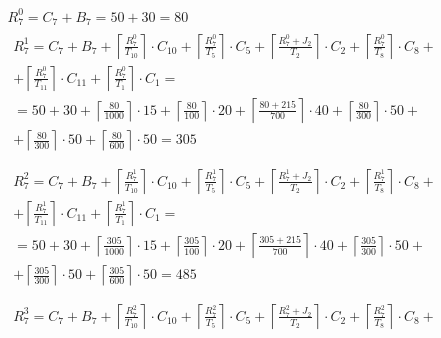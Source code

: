 \begin{gather*}
  R_7^0 = C_7 + B_7 = 50 + 30 = 80 \\
  \begin{multlined}
    R_7^1 = C_7 + B_7 + \left\lceil\frac{R_7^0}{T_{10}}\right\rceil\cdot C_{10} + %
    \left\lceil\frac{R_7^0}{T_5}\right\rceil\cdot C_5 + %
    \left\lceil\frac{R_7^0 + J_2}{T_2}\right\rceil\cdot C_2 + %
    \left\lceil\frac{R_7^0}{T_8}\right\rceil\cdot C_8 + \\%
    + \left\lceil\frac{R_7^0}{T_{11}}\right\rceil\cdot C_{11} + %
    \left\lceil\frac{R_7^0}{T_1}\right\rceil\cdot C_1 = \\%
    = 50 + 30 + \left\lceil\frac{80}{1000}\right\rceil\cdot 15 + %
    \left\lceil\frac{80}{100}\right\rceil\cdot 20 + %
    \left\lceil\frac{80 + 215}{700}\right\rceil\cdot 40 + %
    \left\lceil\frac{80}{300}\right\rceil\cdot 50 + \\%
    + \left\lceil\frac{80}{300}\right\rceil\cdot 50 + %
    \left\lceil\frac{80}{600}\right\rceil\cdot 50 = 305 \\
  \end{multlined} \\
  \begin{multlined}
    R_7^2 = C_7 + B_7 + \left\lceil\frac{R_7^1}{T_{10}}\right\rceil\cdot C_{10} + %
    \left\lceil\frac{R_7^1}{T_5}\right\rceil\cdot C_5 + %
    \left\lceil\frac{R_7^1 + J_2}{T_2}\right\rceil\cdot C_2 + %
    \left\lceil\frac{R_7^1}{T_8}\right\rceil\cdot C_8 + \\%
    + \left\lceil\frac{R_7^1}{T_{11}}\right\rceil\cdot C_{11} + %
    \left\lceil\frac{R_7^1}{T_1}\right\rceil\cdot C_1 = \\%
    = 50 + 30 + \left\lceil\frac{305}{1000}\right\rceil\cdot 15 + %
    \left\lceil\frac{305}{100}\right\rceil\cdot 20 + %
    \left\lceil\frac{305 + 215}{700}\right\rceil\cdot 40 + %
    \left\lceil\frac{305}{300}\right\rceil\cdot 50 + \\%
    + \left\lceil\frac{305}{300}\right\rceil\cdot 50 + %
    \left\lceil\frac{305}{600}\right\rceil\cdot 50 = 485 \\
  \end{multlined} \\
  \begin{multlined}
    R_7^3 = C_7 + B_7 + \left\lceil\frac{R_7^2}{T_{10}}\right\rceil\cdot C_{10} + %
    \left\lceil\frac{R_7^2}{T_5}\right\rceil\cdot C_5 + %
    \left\lceil\frac{R_7^2 + J_2}{T_2}\right\rceil\cdot C_2 + %
    \left\lceil\frac{R_7^2}{T_8}\right\rceil\cdot C_8 + \\%

\end{multlined}
\end{gather*}
